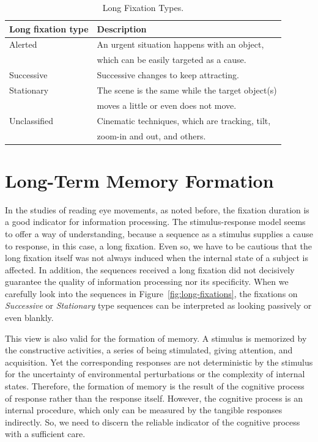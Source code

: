 \documentclass[oneside,master]{snueethesis}
\begin{document}
\begin{table}[htbp]
\begin{center} 
\caption{Long Fixation Types.} 
\label{tab:long-fixation-types} 
\vskip 0.12in
\begin{tabular}{lp{8cm}} 
\hline
Long fixation type    &  Description \\
\hline
Alerted         &   An urgent situation happens with an object, \\
                &   \hspace{5mm} which can be easily targeted as a cause.\\
Successive      &   Successive changes to keep attracting. \\
Stationary      &   The scene is the same while the target object(s) \\
                &   \hspace{5mm} moves a little or even does not move. \\
Unclassified    &   Cinematic techniques, which are tracking, tilt, \\
                &   \hspace{5mm} zoom-in and out, and others. \\
\hline
\end{tabular} 
\end{center} 
\end{table}



\chapter{Long-Term Memory Formation}

In the studies of reading eye movements, as noted before, the fixation duration is a good indicator for information processing. The stimulus-response model seems to offer a way of understanding, because a sequence as a stimulus supplies a cause to response, in this case, a long fixation. Even so, we have to be cautious that the long fixation itself was not always induced when the internal state of a subject is affected. In addition, the sequences received a long fixation did not decisively guarantee the quality of information processing nor its specificity. When we carefully look into the sequences in Figure~\ref{fig:long-fixations}, the fixations on \textit{Successive} or \textit{Stationary} type sequences can be interpreted as looking passively or even blankly.

This view is also valid for the formation of memory. A stimulus is memorized by the constructive activities, a series of being stimulated, giving attention, and acquisition. Yet the corresponding responses are not deterministic by the stimulus for the uncertainty of environmental perturbations or the complexity of internal states. Therefore, the formation of memory is the result of the cognitive process of response rather than the response itself. However, the cognitive process is an internal procedure, which only can be measured by the tangible responses indirectly. So, we need to discern the reliable indicator of the cognitive process with a sufficient care.
\end{document}
